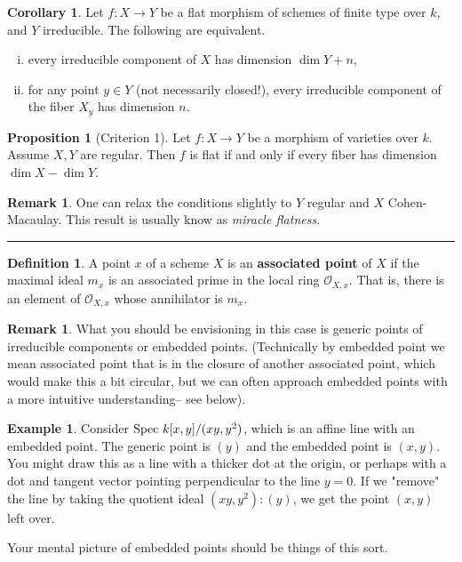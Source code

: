 \documentclass[10pt,reqno]{amsart}
\theoremstyle{definition}
\newtheorem{corollary}[theorem]{Corollary}
\newtheorem{example}[theorem]{Example}
\newtheorem{definition}[theorem]{Definition}
\newtheorem{proposition}[theorem]{Proposition}
\newtheorem{remark}[theorem]{Remark}
\theoremstyle{remark}
\numberwithin{equation}{section}
\numberwithin{theorem}{section}
\newcommand{\OO}{{\mathcal O}}
\newcommand{\spec}{\textup{Spec }}
\begin{document}
\begin{corollary} Let $f: X \to Y$ be a flat morphism of schemes of finite type over $k$, and $Y$ irreducible. The following are equivalent.
\begin{enumerate}[(i)]
\item every irreducible component of $X$ has dimension $\dim Y + n$,
\item for any point $y \in Y$ (not necessarily closed!), every irreducible component of the fiber $X_y$ has dimension $n$.
\end{enumerate}
\end{corollary}

\begin{proposition}[Criterion 1] Let $f: X \to Y$ be a morphism of varieties over $k$. Assume $X,Y$ are regular. Then $f$ is flat if and only if every fiber has dimension $\dim X - \dim Y$.
\end{proposition}

\begin{remark} One can relax the conditions slightly to $Y$ regular and $X$ Cohen-Macaulay. This result is usually know as \textit{miracle flatness}.
\end{remark}

\hrule
\vspace{1em}

\begin{definition} A point $x$ of a scheme $X$ is an \textbf{associated point} of $X$ if the maximal ideal $m_x$ is an associated prime in the local ring $\OO_{X,x}$. That is, there is an element of $\OO_{X,x}$ whose annihilator is $m_x$.
\end{definition}

\begin{remark} What you should be envisioning in this case is generic points of irreducible components or embedded points. (Technically by embedded point we mean associated point that is in the closure of another associated point, which would make this a bit circular, but we can often approach embedded points with a more intuitive understanding-- see below).
\end{remark}

\begin{example} Consider $\spec k[x,y]/(xy,y^2)$, which is an affine line with an embedded point. The generic point is $(y)$ and the embedded point is $(x,y)$. You might draw this as a line with a thicker dot at the origin, or perhaps with a dot and tangent vector pointing perpendicular to the line $y=0$. If we "remove" the line by taking the quotient ideal $(xy,y^2):(y)$, we get the point $(x,y)$ left over. 

Your mental picture of embedded points should be things of this sort. 
\end{example}
\end{document}
